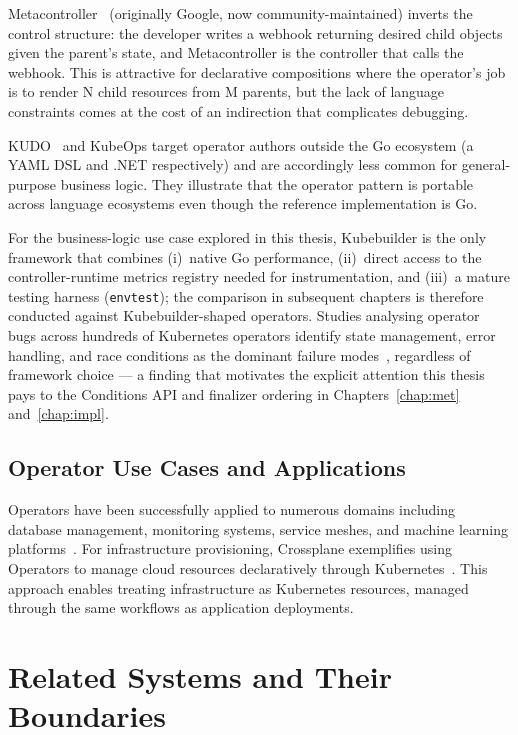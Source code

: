 Metacontroller~\cite{metacontroller} (originally Google, now community-maintained) inverts the control structure: the developer writes a webhook returning desired child objects given the parent's state, and Metacontroller is the controller that calls the webhook. This is attractive for declarative compositions where the operator's job is to render N child resources from M parents, but the lack of language constraints comes at the cost of an indirection that complicates debugging.

KUDO~\cite{kudo} and KubeOps target operator authors outside the Go ecosystem (a YAML DSL and .NET respectively) and are accordingly less common for general-purpose business logic. They illustrate that the operator pattern is portable across language ecosystems even though the reference implementation is Go.

For the business-logic use case explored in this thesis, Kubebuilder is the only framework that combines (i)~native Go performance, (ii)~direct access to the controller-runtime metrics registry needed for instrumentation, and (iii)~a mature testing harness (\texttt{envtest}); the comparison in subsequent chapters is therefore conducted against Kubebuilder-shaped operators. Studies analysing operator bugs across hundreds of Kubernetes operators identify state management, error handling, and race conditions as the dominant failure modes~\cite{operator_bugs}, regardless of framework choice --- a finding that motivates the explicit attention this thesis pays to the Conditions API and finalizer ordering in Chapters~\ref{chap:met} and~\ref{chap:impl}.

\subsection{Operator Use Cases and Applications}

Operators have been successfully applied to numerous domains including database management, monitoring systems, service meshes, and machine learning platforms~\cite{dobies2020, openshift_operators_lifecycle}. For infrastructure provisioning, Crossplane exemplifies using Operators to manage cloud resources declaratively through Kubernetes~\cite{crossplane}. This approach enables treating infrastructure as Kubernetes resources, managed through the same workflows as application deployments.

\section{Related Systems and Their Boundaries}

